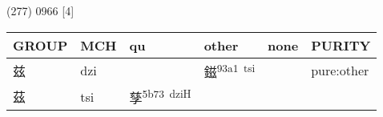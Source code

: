 \documentclass[14pt,a4paper]{scrartcl}
\begin{document}
(277) 0966 {[}4{]}

\begin{longtable}[c]{@{}llllll@{}}
\toprule
\begin{minipage}[b]{0.14\columnwidth}\raggedright\strut
GROUP
\strut\end{minipage} &
\begin{minipage}[b]{0.14\columnwidth}\raggedright\strut
MCH
\strut\end{minipage} &
\begin{minipage}[b]{0.14\columnwidth}\raggedright\strut
qu
\strut\end{minipage} &
\begin{minipage}[b]{0.14\columnwidth}\raggedright\strut
other
\strut\end{minipage} &
\begin{minipage}[b]{0.14\columnwidth}\raggedright\strut
none
\strut\end{minipage} &
\begin{minipage}[b]{0.14\columnwidth}\raggedright\strut
PURITY
\strut\end{minipage}\tabularnewline
\midrule
\endhead
\begin{minipage}[t]{0.14\columnwidth}\raggedright\strut
兹
\strut\end{minipage} &
\begin{minipage}[t]{0.14\columnwidth}\raggedright\strut
dzi
\strut\end{minipage} &
\begin{minipage}[t]{0.14\columnwidth}\raggedright\strut
\strut\end{minipage} &
\begin{minipage}[t]{0.14\columnwidth}\raggedright\strut
鎡\textsuperscript{93a1~tsi}
\strut\end{minipage} &
\begin{minipage}[t]{0.14\columnwidth}\raggedright\strut
\strut\end{minipage} &
\begin{minipage}[t]{0.14\columnwidth}\raggedright\strut
pure:other
\strut\end{minipage}\tabularnewline
\begin{minipage}[t]{0.14\columnwidth}\raggedright\strut
茲
\strut\end{minipage} &
\begin{minipage}[t]{0.14\columnwidth}\raggedright\strut
tsi
\strut\end{minipage} &
\begin{minipage}[t]{0.14\columnwidth}\raggedright\strut
孳\textsuperscript{5b73~dziH}

\end{minipage}
\end{longtable}
\end{document}

